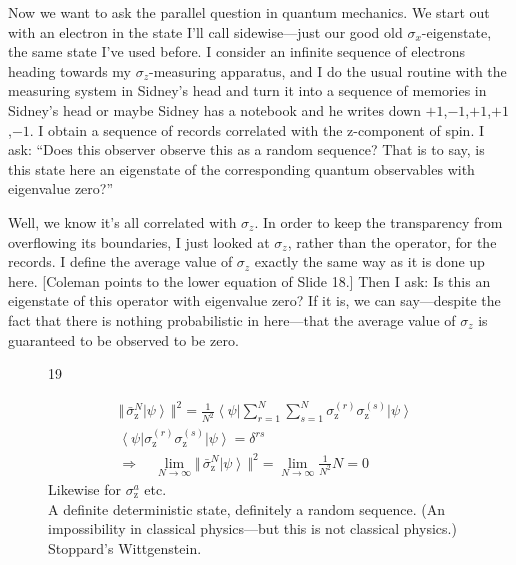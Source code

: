 \documentclass[12pt,nofootinbib]{revtex4}
\newcommand{\bra}[1]{\left\langle#1\right|}
\newcommand{\ket}[1]{\left|#1\right\rangle}
\newcommand{\bignorm}[1]{\bigl\Vert #1\bigr\Vert}
\newcommand{\z}{\text{z}}
\begin{document}
Now we want to ask the parallel question in quantum mechanics. We start out with an electron in the state I'll call sidewise---just our good old $\sigma_x$-eigenstate, the same state I've used before. I consider an infinite sequence of electrons heading towards my $\sigma_z$-measuring apparatus, and I do the usual routine with the measuring system in Sidney's head and turn it into a sequence of memories in Sidney's head or maybe Sidney has a notebook and he writes down $+1$,$-1$,$+1$,$+1$,$-1$. I obtain a sequence of records correlated with the z-component of spin. I ask: ``Does this observer observe this as a random sequence? That is to say, is this state here an eigenstate of the corresponding quantum observables with eigenvalue zero?''

Well, we know it's all correlated with $\sigma_z$. In order to keep the transparency from overflowing its boundaries, I just looked at $\sigma_z$, rather than the operator, for the records. I define the average value
of $\sigma_z$ exactly the same way as it is done up here.  [Coleman points to the lower equation of Slide 18.]  Then I ask:  
Is this an eigenstate of this operator with eigenvalue zero? If it is, we can say---despite the fact that there is nothing probabilistic in here---that the average value of $\sigma_z$ is guaranteed to be observed to be zero.

\begin{figure}[htb] 
\begin{mdframed}
  \vspace{5pt}\hfill 19\\[-18pt]
  \begin{raggedright}
  \begin{align}\nonumber
    &\bignorm{\,\bar\sigma_\z^N\ket{\psi}\, }^2
      =\frac{1}{N^2}\bra{\psi}
      \sum_{r=1}^N \sum_{s=1}^N\sigma_\z^{(r)}\sigma_\z^{(s)}\ket{\psi}
    \\[3pt]\nonumber
    &%
      \bra{\psi}\sigma_\z^{(r)}\sigma_\z^{(s)}\ket{\psi}=\delta^{rs}
    \\[6pt]\nonumber
    &\Rightarrow\quad
    \lim_{N\to\infty}\bignorm{\,\bar\sigma_\z^N\ket{\psi}\, }^2
    =\lim_{N\to\infty}\frac{1}{N^2} N =0
  \end{align}
  Likewise for $\sigma_\z^a$ etc. \\[0.5\baselineskip]

  A definite deterministic state, definitely a random sequence.
  (An impossibility in classical physics---but this is not classical physics.)\\[\baselineskip]

  Stoppard's Wittgenstein.
  \end{raggedright}
\vspace{.5\baselineskip}
\end{mdframed}
\end{figure}
\end{document}

